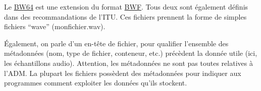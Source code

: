 \documentclass[
  letterpaper,
  DIV=11,
  numbers=noendperiod]{scrreprt}
\begin{document}
\begin{tcolorbox}[enhanced jigsaw, leftrule=.75mm, arc=.35mm, bottomtitle=1mm, colback=white, colbacktitle=quarto-callout-note-color!10!white, opacityback=0, left=2mm, rightrule=.15mm, opacitybacktitle=0.6, breakable, toptitle=1mm, titlerule=0mm, bottomrule=.15mm, toprule=.15mm, coltitle=black, title=\textcolor{quarto-callout-note-color}{\faInfo}\hspace{0.5em}{Note}]

Le \href{https://www.itu.int/rec/R-REC-BS.2088-1-201910-I/en}{BW64} est
une extension du format
\href{https://www.itu.int/rec/R-REC-BS.1352-3-200712-I/en}{BWF}. Tous
deux sont également définis dans des recommandations de l'ITU. Ces
fichiers prennent la forme de simples fichiers ``wave''
(monfichier.wav).

Également, on parle d'un en-tête de fichier, pour qualifier l'ensemble
des métadonnées (nom, type de fichier, conteneur, etc.) précèdent la
donnée utile (ici, les échantillons audio). Attention, les métadonnées
ne sont pas toutes relatives à l'ADM. La plupart les fichiers possèdent
des métadonnées pour indiquer aux programmes comment exploiter les
données qu'ils stockent.

\end{tcolorbox}
\end{document}
